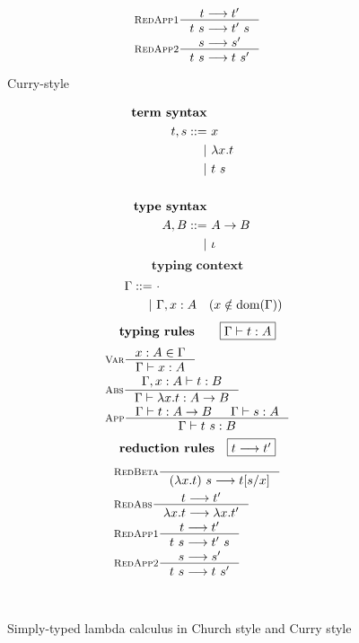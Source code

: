 \begin{figure}
\begin{singlespace}
\begin{minipage}{.46\textwidth}
\begin{align*}
& \inference[\sc RedApp1]{t --> t'}{t~s --> t'~s} \\
& \inference[\sc RedApp2]{s --> s'}{t~s --> t~s'} \\
\end{align*}
\end{minipage}
\begin{minipage}{.46\textwidth}
        \begin{center}Curry-style\end{center}
\def\baselinestretch{0}
\small
\begin{align*}
\textbf{term syntax} \\
t,s ::= &~ x           \\
      | &~ \lambda x    . t \\
      | &~ t ~ s       \\
\\
\textbf{type syntax} \\
A,B ::= &~ A -> B \\
      | &~ \iota  \\
\end{align*}
\[ \textbf{typing context} \]\vspace*{-1em}
\begin{align*}\quad
\Gamma ::= &~ \cdot \\
         | &~ \Gamma, x:A \quad (x\notin \mathop{\mathrm{dom}}(\Gamma)) \\
\end{align*}
\[ \textbf{typing rules}
        \qquad \framebox{$\Gamma |- t : A$} \]
\vspace*{-1em}
\begin{align*}
& \inference[\sc Var]{x:A \in \Gamma}{\Gamma |- x:A} \\
& \inference[\sc Abs]{\Gamma,x:A |- t : B}
                     {\Gamma |- \l x   .t : A -> B} \\
& \inference[\sc App]{\Gamma |- t : A -> B & \Gamma |- s : A}
                     {\Gamma |- t~s : B} \\
\end{align*}
\[ \textbf{reduction rules}
        \quad \framebox{$t --> t'$} \]
\vspace*{-1em}
\begin{align*}
& \inference[\sc RedBeta]{}{(\l x   .t)~s --> t[s/x]} \\
& \inference[\sc RedAbs]{t --> t'}{\l x   .t --> \l x   .t'} \\
& \inference[\sc RedApp1]{t --> t'}{t~s --> t'~s} \\
& \inference[\sc RedApp2]{s --> s'}{t~s --> t~s'} \\
\end{align*}
\end{minipage}
~\\
\caption{Simply-typed lambda calculus in Church style and Curry style}
\label{fig:stlc}
\end{singlespace}
\end{figure}

